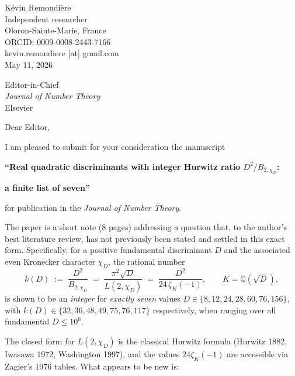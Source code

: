 \documentclass[11pt]{article}
\begin{document}
\begin{flushright}
K\'evin Remondi\`ere\\
Independent researcher\\
Oloron-Sainte-Marie, France\\
ORCID: 0009-0008-2443-7166\\
kevin.remondiere [at] gmail.com\\[1em]
May 11, 2026
\end{flushright}

\bigskip

\noindent Editor-in-Chief\\
\emph{Journal of Number Theory}\\
Elsevier

\bigskip

\noindent Dear Editor,

I am pleased to submit for your consideration the manuscript

\smallskip
\centerline{\textbf{``Real quadratic discriminants with integer Hurwitz ratio $D^{2}/B_{2,\chi_{D}}$:}}
\centerline{\textbf{a finite list of seven''}}
\smallskip

\noindent for publication in the \emph{Journal of Number Theory}.

The paper is a short note (8 pages) addressing a question that, to the
author's best literature review, has not previously been stated and
settled in this exact form.  Specifically, for a positive fundamental
discriminant $D$ and the associated even Kronecker character
$\chi_{D}$, the rational number
\[
k(D)\;:=\;\frac{D^{2}}{B_{2,\chi_{D}}}\;=\;\frac{\pi^{2}\sqrt{D}}{L(2,\chi_{D})}\;=\;\frac{D^{2}}{24\,\zeta_{K}(-1)},\qquad K=\mathbb{Q}(\sqrt{D}),
\]
is shown to be an \emph{integer} for \emph{exactly seven} values
$D\in\{8,12,24,28,60,76,156\}$, with $k(D)\in\{32,36,48,49,75,76,117\}$
respectively, when ranging over all fundamental $D\le 10^{6}$.

The closed form for $L(2,\chi_{D})$ is the classical Hurwitz formula
(Hurwitz 1882, Iwasawa 1972, Washington 1997), and the values
$24\zeta_{K}(-1)$ are accessible via Zagier's 1976 tables.  What
appears to be new is:
\end{document}
